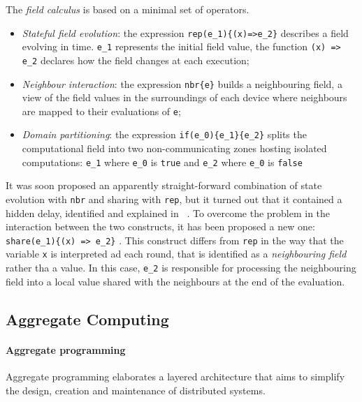 The \emph{field calculus} is based on a minimal set of operators.
\begin{itemize}
    \item \emph{Stateful field evolution}: the expression \lstinline|rep(e_1){(x)=>e_2}| describes a field evolving in time.
        \lstinline{e_1} represents the initial field value, the function \lstinline|(x) => e_2| declares how the field changes
        at each execution;
    \item \emph{Neighbour interaction}: the expression \lstinline|nbr{e}| builds a neighbouring field, a view of the field
        values in the surroundings of each device where neighbours are mapped to their evaluations of \texttt{e};
    \item \emph{Domain partitioning}: the expression \lstinline|if(e_0){e_1}{e_2}| splits the computational field into
        two non-communicating zones hosting isolated computations: \lstinline|e_1| where \lstinline|e_0| is \texttt{true} and
        \lstinline{e_2} where \lstinline{e_0} is \texttt{false} %
\end{itemize}

It was soon proposed an apparently straight-forward combination of state evolution with \texttt{nbr} and sharing with \texttt{rep},
but it turned out that it contained a hidden delay, identified and explained in ~\cite{10.1007/978-3-319-92408-3_1}.
To overcome the problem in the interaction between the two constructs, it has been proposed a new one:
\lstinline|share(e_1){(x) => e_2}| \cite{10.1007/978-3-030-22397-7_4}. %
This construct differs from \texttt{rep} in the way that the variable \texttt{x} is interpreted ad each round, that is
identified as a \emph{neighbouring field} rather tha a value.
In this case, \lstinline|e_2| is responsible for processing the neighbouring field into a local value shared with the
neighbours at the end of the evaluation.

\subsection{Aggregate Computing}
\label{subsec:aggregate-computing}

\paragraph{Aggregate programming}
Aggregate programming elaborates a layered architecture that aims to simplify the design, creation and maintenance of
distributed systems.

